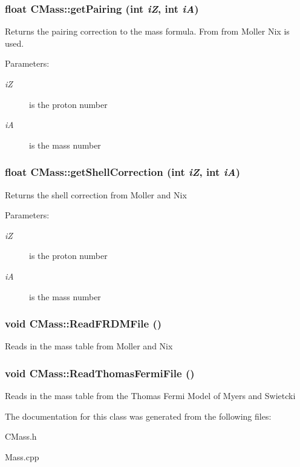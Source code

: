 \subsubsection{\setlength{\rightskip}{0pt plus 5cm}float CMass::get\-Pairing (int {\em i\-Z}, int {\em i\-A})}\label{classCMass_57d4167da3dd5783572dffacd3f1f644}


Returns the pairing correction to the mass formula. From from Moller Nix is used. \begin{Desc}
\item[Parameters:]
\begin{description}
\item[{\em i\-Z}]is the proton number \item[{\em i\-A}]is the mass number \end{description}
\end{Desc}
\subsubsection{\setlength{\rightskip}{0pt plus 5cm}float CMass::get\-Shell\-Correction (int {\em i\-Z}, int {\em i\-A})}\label{classCMass_4e81cde4776e71f637ff28cb7b04f20a}


Returns the shell correction from Moller and Nix

\begin{Desc}
\item[Parameters:]
\begin{description}
\item[{\em i\-Z}]is the proton number \item[{\em i\-A}]is the mass number \end{description}
\end{Desc}
\subsubsection{\setlength{\rightskip}{0pt plus 5cm}void CMass::Read\-FRDMFile ()\hspace{0.3cm}{\tt  [protected]}}\label{classCMass_95df5960907d3cde94a79ba1de582681}


Reads in the mass table from Moller and Nix 
\subsubsection{\setlength{\rightskip}{0pt plus 5cm}void CMass::Read\-Thomas\-Fermi\-File ()\hspace{0.3cm}{\tt  [protected]}}\label{classCMass_f1fa180e06c50061df38460b1116de82}


Reads in the mass table from the Thomas Fermi Model of Myers and Swietcki 

The documentation for this class was generated from the following files:\begin{CompactItemize}
\item 
CMass.h\item 
Mass.cpp\end{CompactItemize}

